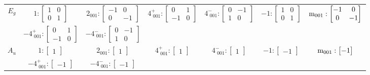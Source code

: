 \documentclass[fleqn,8pt,landscape]{jsarticle}
\begin{document}
\begin{longtable}{ccccccc}
$ E_{g} $ & $ 1:\begin{bmatrix} 1 & 0 \\ 0 & 1 \end{bmatrix} $ & $ 2{}_{001}:\begin{bmatrix} -1 & 0 \\ 0 & -1 \end{bmatrix} $ & $ 4^{+}_{\,\,001}:\begin{bmatrix} 0 & 1 \\ -1 & 0 \end{bmatrix} $ & $ 4^{-}_{\,\,001}:\begin{bmatrix} 0 & -1 \\ 1 & 0 \end{bmatrix} $ & $ -1:\begin{bmatrix} 1 & 0 \\ 0 & 1 \end{bmatrix} $ & $ {\rm m}_{001}:\begin{bmatrix} -1 & 0 \\ 0 & -1 \end{bmatrix} $ \\
& $ -4^{+}_{\,\,001}:\begin{bmatrix} 0 & 1 \\ -1 & 0 \end{bmatrix} $ & $ -4^{-}_{\,\,001}:\begin{bmatrix} 0 & -1 \\ 1 & 0 \end{bmatrix} $ & $  $ & $  $ & $  $ & $  $ \\ \hline
$ A_{u} $ & $ 1:\begin{bmatrix} 1 \end{bmatrix} $ & $ 2{}_{001}:\begin{bmatrix} 1 \end{bmatrix} $ & $ 4^{+}_{\,\,001}:\begin{bmatrix} 1 \end{bmatrix} $ & $ 4^{-}_{\,\,001}:\begin{bmatrix} 1 \end{bmatrix} $ & $ -1:\begin{bmatrix} -1 \end{bmatrix} $ & $ {\rm m}_{001}:\begin{bmatrix} -1 \end{bmatrix} $ \\
& $ -4^{+}_{\,\,001}:\begin{bmatrix} -1 \end{bmatrix} $ & $ -4^{-}_{\,\,001}:\begin{bmatrix} -1 \end{bmatrix} $ & $  $ & $  $ & $  $ & $  $ \\ \hline

\end{longtable}
\end{document}

